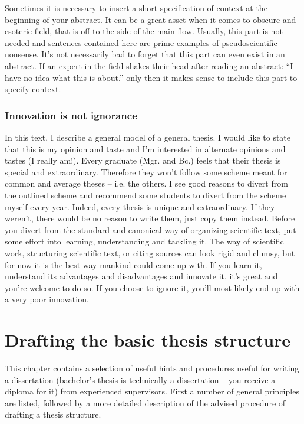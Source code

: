 Sometimes it is necessary to insert a short specification of context at the beginning of your abstract. It can be a great asset when it comes to obscure and esoteric field, that is off to the side of the main flow. Usually, this part is not needed and sentences contained here are prime examples of pseudoscientific nonsense. It's not necessarily bad to forget that this part can even exist in an abstract. If an expert in the field shakes their head after reading an abstract: ``I have no idea what this is about.'' only then it makes sense to include this part to specify context.


\subsection*{Innovation is not ignorance}

In this text, I describe a general model of a general thesis. I would like to state that this is my opinion and taste and I'm interested in alternate opinions and tastes (I really am!). Every graduate (Mgr. and Bc.) feels that their thesis is special and extraordinary. Therefore they won't follow some scheme meant for common and average theses -- i.e. the others. I see good reasons to divert from the outlined scheme and recommend some students to divert from the scheme myself every year. Indeed, every thesis is unique and extraordinary. If they weren't, there would be no reason to write them, just copy them instead. Before you divert from the standard and canonical way of organizing scientific text, put some effort into learning, understanding and tackling it. The way of scientific work, structuring scientific text, or citing sources can look rigid and clumsy, but for now it is the best way mankind could come up with. If you learn it, understand its advantages and disadvantages and innovate it, it's great and you're welcome to do so. If you choose to ignore it, you'll most likely end up with a very poor innovation.

\chapter{Drafting the basic thesis structure}
\label{struktura}

This chapter contains a selection of useful hints and procedures useful for writing a dissertation (bachelor's thesis is technically a dissertation -- you receive a diploma for it) from experienced supervisors. First a number of general principles are listed, followed by a more detailed description of the advised procedure of drafting a thesis structure.

